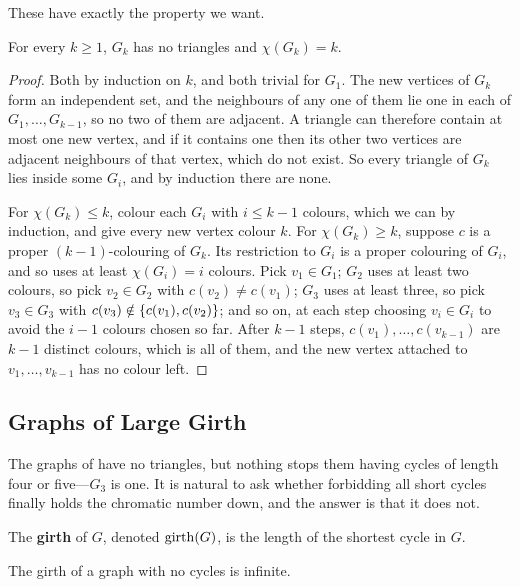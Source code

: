 These have exactly the property we want.

\begin{boxproposition} \label{Ch2:Prop:Zykov}
    For every $k \geq 1$, $G_k$ has no triangles and $\chi(G_k) = k$.
\end{boxproposition}
\begin{proof}
    Both by induction on $k$, and both trivial for $G_1$. The new vertices of $G_k$ form an independent set, and the neighbours of any one of them lie one in each of $G_1, \ldots, G_{k-1}$, so no two of them are adjacent. A triangle can therefore contain at most one new vertex, and if it contains one then its other two vertices are adjacent neighbours of that vertex, which do not exist. So every triangle of $G_k$ lies inside some $G_i$, and by induction there are none.

    For $\chi(G_k) \leq k$, colour each $G_i$ with $i \leq k - 1$ colours, which we can by induction, and give every new vertex colour $k$. For $\chi(G_k) \geq k$, suppose $c$ is a proper $(k-1)$-colouring of $G_k$. Its restriction to $G_i$ is a proper colouring of $G_i$, and so uses at least $\chi(G_i) = i$ colours. Pick $v_1 \in G_1$; $G_2$ uses at least two colours, so pick $v_2 \in G_2$ with $c(v_2) \neq c(v_1)$; $G_3$ uses at least three, so pick $v_3 \in G_3$ with $c(v_3) \notin \left\{ c(v_1), c(v_2) \right\}$; and so on, at each step choosing $v_i \in G_i$ to avoid the $i - 1$ colours chosen so far. After $k - 1$ steps, $c(v_1), \ldots, c(v_{k-1})$ are $k - 1$ distinct colours, which is all of them, and the new vertex attached to $v_1, \ldots, v_{k-1}$ has no colour left.
\end{proof}

\subsection{Graphs of Large Girth}

The graphs of  have no triangles, but nothing stops them having cycles of length four or five---$G_3$ is one. It is natural to ask whether forbidding all short cycles finally holds the chromatic number down, and the answer is that it does not.

\begin{boxdefinition}[Girth]
    The \textbf{girth} of $G$, denoted $\operatorname{girth}(G)$, is the length of the shortest cycle in $G$.
\end{boxdefinition}

The girth of a graph with no cycles is infinite.

